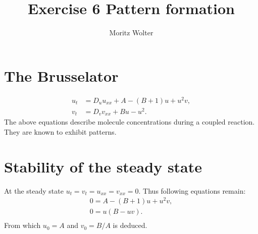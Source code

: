 




\title{Exercise 6 Pattern formation}
\author{Moritz Wolter}

\maketitle

\section{The Brusselator}
\begin{align}
u_t &= D_u u_{xx} + A - (B + 1)u + u^2 v, \\
v_t &= D_v v_{xx} + Bu - u^2 .
\end{align}
The above equations describe molecule concentrations during a coupled reaction. They are known to exhibit patterns.  

\section{Stability of the steady state}
At the steady state $u_t = v_t = u_{xx} = v_{xx} = 0$. Thus following equations remain:
\begin{align}
0 = A - (B + 1)u + u^2v, \\
0 = u(B - uv). \\
\end{align}
From which $u_0 = A$ and $v_0 = B/A$ is deduced. 


